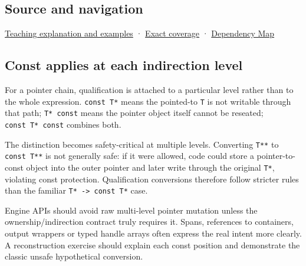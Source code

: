 \subsection{Source and navigation}\label{appendix-5e1a7561cd98-source-and-navigation}

\hyperref[01-foundations-i-ch003-read-only-is-a-path-not-an-ownership-or-synchronization-promise]{Teaching explanation and examples} · \hyperref[appendix-fd090d982a15-m008---parts-113-126]{Exact coverage} · \hyperref[appendix-4ad47bdd269a]{Dependency Map}

\subsection{Const applies at each indirection level}\label{appendix-5e1a7561cd98-const-applies-at-each-indirection-level}

For a pointer chain, qualification is attached to a particular level rather than to the whole expression. \texttt{const\ T*} means the pointed-to \texttt{T} is not writable through that path; \texttt{T*\ const} means the pointer object itself cannot be reseated; \texttt{const\ T*\ const} combines both.

The distinction becomes safety-critical at multiple levels. Converting \texttt{T**} to \texttt{const\ T**} is not generally safe: if it were allowed, code could store a pointer-to-const object into the outer pointer and later write through the original \texttt{T*}, violating const protection. Qualification conversions therefore follow stricter rules than the familiar \texttt{T*\ -\textgreater{}\ const\ T*} case.

Engine APIs should avoid raw multi-level pointer mutation unless the ownership/indirection contract truly requires it. Spans, references to containers, output wrappers or typed handle arrays often express the real intent more clearly. A reconstruction exercise should explain each const position and demonstrate the classic unsafe hypothetical conversion.

